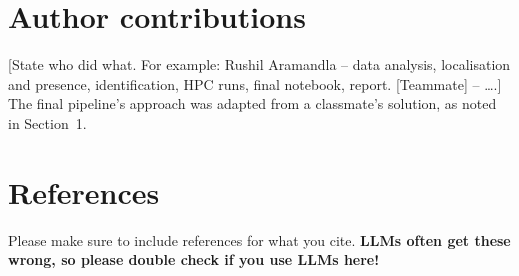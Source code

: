 \documentclass[a4paper,11pt]{article}
\newcommand{\fillin}[1]{{\color{red}[#1]}}
\begin{document}
\section{Author contributions}
\fillin{State who did what. For example: Rushil Aramandla -- data analysis, localisation and presence, identification,
HPC runs, final notebook, report. [Teammate] -- \dots.} The final pipeline's approach was adapted from a classmate's
solution, as noted in Section~1.

\section{References}
Please make sure to include references for what you cite. \textbf{LLMs often get these wrong, so please double check if you use LLMs here!}

\printbibliography
\end{document}
